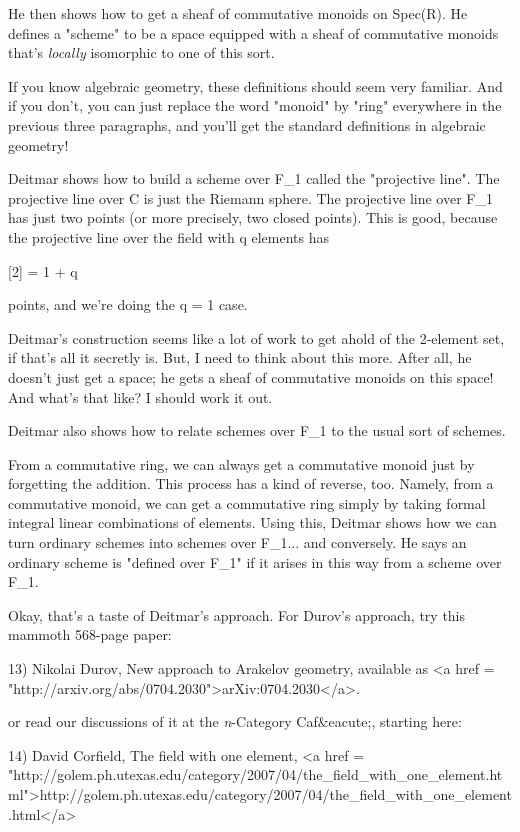 He then shows how to get a sheaf of commutative monoids on Spec(R).
He defines a "scheme" to be a space equipped with a sheaf of 
commutative monoids that's \emph{locally} isomorphic to one of this sort. 

If you know algebraic geometry, these definitions should seem very
familiar.  And if you don't, you can just replace the word "monoid"
by "ring" everywhere in the previous three paragraphs, and you'll get
the standard definitions in algebraic geometry!

Deitmar shows how to build a scheme over F_{1} called the
"projective line".  The projective line over C is just the
Riemann sphere.  The projective line over F_{1} has just two
points (or more precisely, two closed points).  This is good, because
the projective line over the field with q elements has

[2] = 1 + q

points, and we're doing the q = 1 case.  

Deitmar's construction seems like a lot of work to get ahold of the 
2-element set, if that's all it secretly is.  But, I need to think 
about this more.  After all, he doesn't just get a space; he gets a 
sheaf of commutative monoids on this space!  And what's that like?
I should work it out.

Deitmar also shows how to relate schemes over F_{1} to the usual sort
of schemes.

From a commutative ring, we can always get a commutative monoid just
by forgetting the addition.  This process has a kind of reverse, too.
Namely, from a commutative monoid, we can get a commutative ring 
simply by taking formal integral linear combinations of elements.  
Using this, Deitmar shows how we can turn ordinary schemes into 
schemes over F_{1}... and conversely.  He says an ordinary scheme is 
"defined over F_{1}" if it arises in this way from a scheme over F_{1}.  

Okay, that's a taste of Deitmar's approach.  For Durov's approach, 
try this mammoth 568-page paper:

13) Nikolai Durov, New approach to Arakelov geometry, available as
<a href = "http://arxiv.org/abs/0704.2030">arXiv:0704.2030</a>.

or read our discussions of it at the \emph{n}-Category Caf&eacute;, 
starting here:

14) David Corfield, The field with one element, 
<a href = "http://golem.ph.utexas.edu/category/2007/04/the_field_with_one_element.html">http://golem.ph.utexas.edu/category/2007/04/the_field_with_one_element.html</a>

